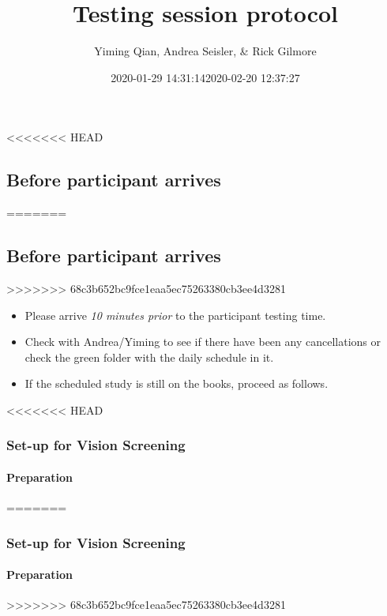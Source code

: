 \documentclass[]{article}
\title{Testing session protocol}
\author{Yiming Qian, Andrea Seisler, \& Rick Gilmore}
\date{2020-01-29 14:31:14}
\date{2020-02-20 12:37:27}
\providecommand{\tightlist}{%
  \setlength{\itemsep}{0pt}\setlength{\parskip}{0pt}}
\let\oldparagraph\paragraph
\renewcommand{\paragraph}[1]{\oldparagraph{#1}\mbox{}}
\begin{document}
\maketitle

{
\setcounter{tocdepth}{3}
\tableofcontents
}
<<<<<<< HEAD
\subsection{Before participant
arrives}\label{before-participant-arrives}
=======
\hypertarget{before-participant-arrives}{%
\subsection{Before participant
arrives}\label{before-participant-arrives}}
>>>>>>> 68c3b652bc9fce1eaa5ec75263380cb3ee4d3281

\begin{itemize}
\tightlist
\item
  Please arrive \emph{10 minutes prior} to the participant testing time.
\item
  Check with Andrea/Yiming to see if there have been any cancellations
  or check the green folder with the daily schedule in it.
\item
  If the scheduled study is still on the books, proceed as follows.
\end{itemize}

<<<<<<< HEAD
\subsubsection{Set-up for Vision
Screening}\label{set-up-for-vision-screening}

\paragraph{Preparation}\label{preparation}
=======
\hypertarget{set-up-for-vision-screening}{%
\subsubsection{Set-up for Vision
Screening}\label{set-up-for-vision-screening}}

\hypertarget{preparation}{%
\paragraph{Preparation}\label{preparation}}
>>>>>>> 68c3b652bc9fce1eaa5ec75263380cb3ee4d3281
\end{document}
